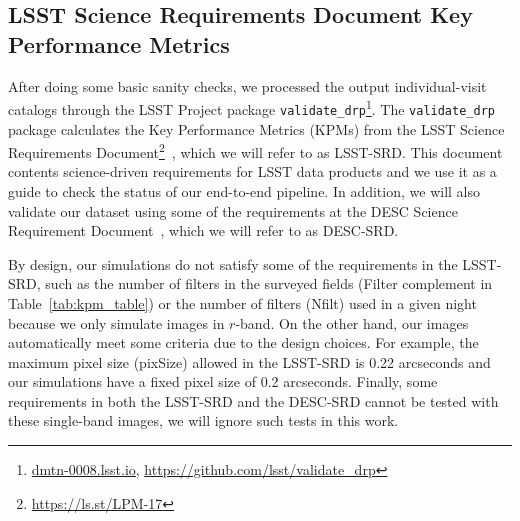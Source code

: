 \documentclass[twocolumn]{aastex62}
\begin{document}


\subsection{LSST Science Requirements Document Key Performance Metrics}

After doing some basic sanity checks, we processed the output individual-visit catalogs through the LSST Project package \texttt{validate\_drp}\footnote{\url{dmtn-0008.lsst.io}, \url{https://github.com/lsst/validate_drp}}.
The \texttt{validate\_drp} package calculates the Key Performance Metrics (KPMs) from the LSST Science Requirements Document\footnote{\url{https://ls.st/LPM-17}}~\citep{LPM-17}, which we will refer to as LSST-SRD. This document contents science-driven requirements for LSST data products and we use it as a guide to check the status of our end-to-end pipeline. In addition, we will also validate our dataset using some of the requirements at the DESC Science Requirement Document~\citep[][DESC-SRD;]{2018arXiv180901669T}, which we will refer to as DESC-SRD.
 
By design, our simulations do not satisfy some of the requirements in the LSST-SRD, such as the number of filters in the surveyed fields (Filter complement in Table~\ref{tab:kpm_table}) or the number of filters (Nfilt) used in a given night because we only simulate images in $r$-band. On the other hand, our images automatically meet some criteria due to the design choices. For example, the maximum pixel size (pixSize) allowed in the LSST-SRD is 0.22 arcseconds and our simulations have a fixed pixel size of 0.2 arcseconds. Finally, some requirements in both the LSST-SRD and the DESC-SRD cannot be tested with these single-band images, we will ignore such tests in this work.
\end{document}
